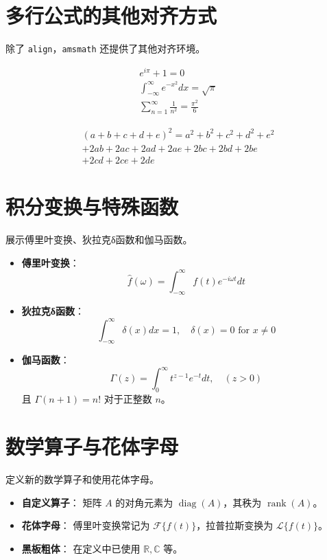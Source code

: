 \documentclass{article}
\begin{document}
\section{多行公式的其他对齐方式}
除了 \texttt{align}，\texttt{amsmath} 还提供了其他对齐环境。

\begin{gather}
e^{i\pi} + 1 = 0 \\
\int_{-\infty}^{\infty} e^{-x^2} dx = \sqrt{\pi} \\
\sum_{n=1}^{\infty} \frac{1}{n^2} = \frac{\pi^2}{6}
\end{gather}

\begin{multline}
(a + b + c + d + e)^2 = a^2 + b^2 + c^2 + d^2 + e^2 \\
+ 2ab + 2ac + 2ad + 2ae + 2bc + 2bd + 2be \\
+ 2cd + 2ce + 2de
\end{multline}

\section{积分变换与特殊函数}
展示傅里叶变换、狄拉克δ函数和伽马函数。

\begin{itemize}
    \item \textbf{傅里叶变换}：
    \[
    \hat{f}(\omega) = \int_{-\infty}^{\infty} f(t) e^{-i\omega t} dt
    \]
    \item \textbf{狄拉克δ函数}：
    \[
    \int_{-\infty}^{\infty} \delta(x) dx = 1, \quad \delta(x) = 0 \text{ for } x \neq 0
    \]
    \item \textbf{伽马函数}：
    \[
    \Gamma(z) = \int_{0}^{\infty} t^{z-1} e^{-t} dt, \quad (z > 0)
    \]
    且 $\Gamma(n+1) = n!$ 对于正整数 $n$。
\end{itemize}

\section{数学算子与花体字母}
定义新的数学算子和使用花体字母。

\DeclareMathOperator{\diag}{diag}
\DeclareMathOperator{\rank}{rank}

\begin{itemize}
    \item \textbf{自定义算子}：
    矩阵 $A$ 的对角元素为 $\diag(A)$，其秩为 $\rank(A)$。
    \item \textbf{花体字母}：
    傅里叶变换常记为 $\mathcal{F}\{f(t)\}$，拉普拉斯变换为 $\mathcal{L}\{f(t)\}$。
    \item \textbf{黑板粗体}：
    在定义中已使用 $\mathbb{R}, \mathbb{C}$ 等。
\end{itemize}
\end{document}
